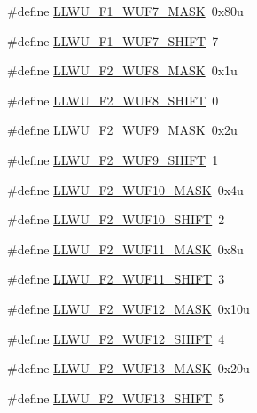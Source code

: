 \begin{DoxyCompactItemize}
\#define \hyperlink{group___l_l_w_u___register___masks_ga085396c6707e1233072318b9f791a179}{L\+L\+W\+U\+\_\+\+F1\+\_\+\+W\+U\+F7\+\_\+\+M\+A\+SK}~0x80u
\item 
\#define \hyperlink{group___l_l_w_u___register___masks_ga6ec44402fb6f1879376fce39e4f48618}{L\+L\+W\+U\+\_\+\+F1\+\_\+\+W\+U\+F7\+\_\+\+S\+H\+I\+FT}~7
\item 
\#define \hyperlink{group___l_l_w_u___register___masks_ga76228bf3593a9417e43e509166c07fad}{L\+L\+W\+U\+\_\+\+F2\+\_\+\+W\+U\+F8\+\_\+\+M\+A\+SK}~0x1u
\item 
\#define \hyperlink{group___l_l_w_u___register___masks_ga88963ab5583725d163689b615ce5a638}{L\+L\+W\+U\+\_\+\+F2\+\_\+\+W\+U\+F8\+\_\+\+S\+H\+I\+FT}~0
\item 
\#define \hyperlink{group___l_l_w_u___register___masks_ga28d89e3d08f5a7db6ffbe56e9e35d771}{L\+L\+W\+U\+\_\+\+F2\+\_\+\+W\+U\+F9\+\_\+\+M\+A\+SK}~0x2u
\item 
\#define \hyperlink{group___l_l_w_u___register___masks_gabc3e93b75e1e8e95f392b59b5dbf6edf}{L\+L\+W\+U\+\_\+\+F2\+\_\+\+W\+U\+F9\+\_\+\+S\+H\+I\+FT}~1
\item 
\#define \hyperlink{group___l_l_w_u___register___masks_gae005607b6cb3ebf1a7def97cd8b2abc5}{L\+L\+W\+U\+\_\+\+F2\+\_\+\+W\+U\+F10\+\_\+\+M\+A\+SK}~0x4u
\item 
\#define \hyperlink{group___l_l_w_u___register___masks_ga0ac579128aa08740377c46fd52be2bb5}{L\+L\+W\+U\+\_\+\+F2\+\_\+\+W\+U\+F10\+\_\+\+S\+H\+I\+FT}~2
\item 
\#define \hyperlink{group___l_l_w_u___register___masks_ga618834480f34a7997f2f4fab80d87400}{L\+L\+W\+U\+\_\+\+F2\+\_\+\+W\+U\+F11\+\_\+\+M\+A\+SK}~0x8u
\item 
\#define \hyperlink{group___l_l_w_u___register___masks_ga37c17efe2e5332ad92f9a05d9a15a2f2}{L\+L\+W\+U\+\_\+\+F2\+\_\+\+W\+U\+F11\+\_\+\+S\+H\+I\+FT}~3
\item 
\#define \hyperlink{group___l_l_w_u___register___masks_ga59dfa340c96f0c04fe3667e00dfb0575}{L\+L\+W\+U\+\_\+\+F2\+\_\+\+W\+U\+F12\+\_\+\+M\+A\+SK}~0x10u
\item 
\#define \hyperlink{group___l_l_w_u___register___masks_gae04234ed612320f80fe119820ae78e39}{L\+L\+W\+U\+\_\+\+F2\+\_\+\+W\+U\+F12\+\_\+\+S\+H\+I\+FT}~4
\item 
\#define \hyperlink{group___l_l_w_u___register___masks_ga6618b24b83e2e28d9268c1f5fac431af}{L\+L\+W\+U\+\_\+\+F2\+\_\+\+W\+U\+F13\+\_\+\+M\+A\+SK}~0x20u
\item 
\#define \hyperlink{group___l_l_w_u___register___masks_ga6c8e71714d1a4c5e9b8dddb08d41679e}{L\+L\+W\+U\+\_\+\+F2\+\_\+\+W\+U\+F13\+\_\+\+S\+H\+I\+FT}~5

\end{DoxyCompactItemize}
